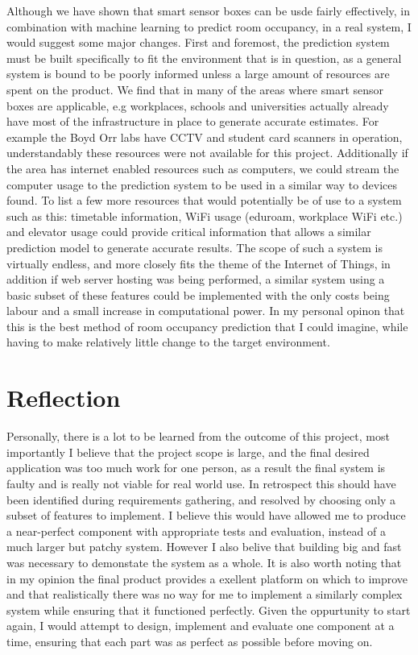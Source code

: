 \documentclass{l4proj}
\begin{document}
Although we have shown that smart sensor boxes can be usde fairly effectively, in combination with machine learning to predict room occupancy, in a real system, I would suggest some major changes. First and foremost, the prediction system must be built specifically to fit the environment that is in question, as a general system is bound to be poorly informed unless a large amount of resources are spent on the product. We find that in many of the areas where smart sensor boxes are applicable, e.g workplaces, schools and universities actually already have most of the infrastructure in place to generate accurate estimates. For example the Boyd Orr labs have CCTV and student card scanners in operation, understandably these resources were not available for this project. Additionally if the area has internet enabled resources such as computers, we could stream the computer usage to the prediction system to be used in a similar way to devices found. To list a few more resources that would potentially be of use to a system such as this: timetable information, WiFi usage (eduroam, workplace WiFi etc.) and elevator usage could provide critical information that allows a similar prediction model to generate accurate results. The scope of such a system is virtually endless, and more closely fits the theme of the Internet of Things, in addition if web server hosting was being performed, a similar system using a basic subset of these features could be implemented with the only costs being labour and a small increase in computational power. In my personal opinon that this is the best method of room occupancy prediction that I could imagine, while having to make relatively little change to the target environment. 

\section{Reflection}

Personally, there is a lot to be learned from the outcome of this project, most importantly I believe that the project scope is large, and the final desired application was too much work for one person, as a result the final system is faulty and is really not viable for real world use. In retrospect this should have been identified during requirements gathering, and resolved by choosing only a subset of features to implement. I believe this would have allowed me to produce a near-perfect component with appropriate tests and evaluation, instead of a much larger but patchy system. However I also belive that building big and fast was necessary to demonstate the system as a whole. It is also worth noting that in my opinion the final product provides a exellent platform on which to improve and that realistically there was no way for me to implement a similarly complex system while ensuring that it functioned perfectly. Given the oppurtunity to start again, I would attempt to design, implement and evaluate one component at a time, ensuring that each part was as perfect as possible before moving on.
\end{document}
